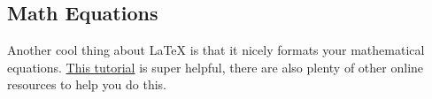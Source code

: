 \documentclass[class=report,11pt,crop=false]{standalone}
\begin{document}
\subsection{Math Equations}
Another cool thing about LaTeX is that it nicely formats your mathematical equations. \href{https://www.overleaf.com/learn/latex/Mathematical_expressions}{This tutorial} is super helpful, there are also plenty of other online resources to help you do this.





\ifstandalone

\fi
\end{document}
